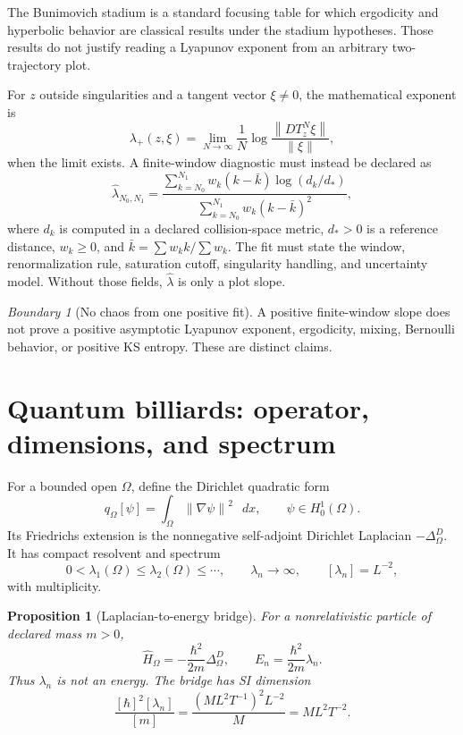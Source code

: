 \documentclass[11pt,a4paper]{article}
\theoremstyle{definition}
\theoremstyle{plain}
\newtheorem{proposition}[definition]{Proposition}
\theoremstyle{remark}
\newtheorem{warning}[definition]{Boundary}
\newcommand{\dd}{\mathop{}\!d}
\newcommand{\norm}[1]{\left\lVert #1\right\rVert}
\begin{document}
The Bunimovich stadium is a standard focusing table for which
ergodicity and hyperbolic behavior are classical results under the
stadium hypotheses. Those results do not justify reading a Lyapunov
exponent from an arbitrary two-trajectory plot.

For \(z\) outside singularities and a tangent vector \(\xi\ne0\), the
mathematical exponent is
\begin{equation}\label{eq:lyapunov}
\lambda_+(z,\xi)
=\lim_{N\to\infty}\frac1N
\log\frac{\norm{D T_z^N\xi}}{\norm{\xi}},
\end{equation}
when the limit exists. A finite-window diagnostic must instead be
declared as
\begin{equation}\label{eq:finite-time-proxy}
\widehat\lambda_{N_0,N_1}
=\frac{\sum_{k=N_0}^{N_1}w_k(k-\bar k)
\log(d_k/d_*)}
{\sum_{k=N_0}^{N_1}w_k(k-\bar k)^2},
\end{equation}
where \(d_k\) is computed in a declared collision-space metric,
\(d_*>0\) is a reference distance, \(w_k\ge0\), and
\(\bar k=\sum w_kk/\sum w_k\). The fit must state the window,
renormalization rule, saturation cutoff, singularity handling, and
uncertainty model. Without those fields,
\(\widehat\lambda\) is only a plot slope.

\begin{warning}[No chaos from one positive fit]
A positive finite-window slope does not prove a positive asymptotic
Lyapunov exponent, ergodicity, mixing, Bernoulli behavior, or positive
KS entropy. These are distinct claims.
\end{warning}

\section{Quantum billiards: operator, dimensions, and spectrum}

For a bounded open \(\Omega\), define the Dirichlet quadratic form
\[
q_\Omega[\psi]=\int_\Omega\norm{\nabla\psi}^2\,\dd x,
\qquad \psi\in H_0^1(\Omega).
\]
Its Friedrichs extension is the nonnegative self-adjoint Dirichlet
Laplacian \(-\Delta_\Omega^D\). It has compact resolvent and spectrum
\begin{equation}\label{eq:laplacian-spectrum}
0<\lambda_1(\Omega)\le\lambda_2(\Omega)\le\cdots,
\qquad \lambda_n\to\infty,
\qquad [\lambda_n]=L^{-2},
\end{equation}
with multiplicity.

\begin{proposition}[Laplacian-to-energy bridge]
\label{prop:energy-bridge}
For a nonrelativistic particle of declared mass \(m>0\),
\[
\widehat H_\Omega
=-\frac{\hbar^2}{2m}\Delta_\Omega^D,
\qquad
E_n=\frac{\hbar^2}{2m}\lambda_n.
\]
Thus \(\lambda_n\) is not an energy. The bridge has SI dimension
\[
\frac{[\hbar]^2[\lambda_n]}{[m]}
=\frac{(ML^2T^{-1})^2L^{-2}}{M}
=ML^2T^{-2}.
\]
\end{proposition}
\end{document}
